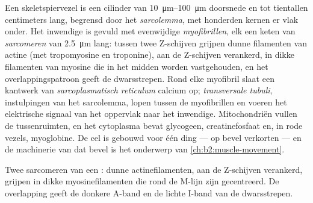 \begin{definition}[De spiervezel]\label{def:b2:cell-differentiation:fibre}
Een skeletspiervezel is een cilinder van \qtyrange{10}{100}{\micro m}
doorsnede en tot tientallen centimeters lang, begrensd door het
\emph{sarcolemma}, met honderden kernen er vlak onder. Het inwendige is
gevuld met evenwijdige \emph{myofibrillen}, elk een keten van
\emph{sarcomeren} van \qty{2.5}{\micro m} lang: tussen twee Z-schijven
grijpen dunne filamenten van actine (met tropomyosine en troponine), aan de
Z-schijven verankerd, in dikke filamenten van myosine die in het midden
worden vastgehouden, en het overlappingspatroon geeft de dwarsstrepen. Rond
elke myofibril slaat een kantwerk van \emph{sarcoplasmatisch reticulum}
calcium op; \emph{transversale tubuli}, instulpingen van het sarcolemma,
lopen tussen de myofibrillen en voeren het elektrische signaal van het
oppervlak naar het inwendige. Mitochondriën vullen de tussenruimten, en het
cytoplasma bevat glycogeen, creatinefosfaat en, in rode vezels,
myoglobine. De cel is gebouwd voor één ding --- op bevel verkorten --- en de
machinerie van dat bevel is het onderwerp van
\cref{ch:b2:muscle-movement}.
\end{definition}

\begin{omfigure}

{\small Twee sarcomeren van een : dunne actinefilamenten, aan de
Z-schijven verankerd, grijpen in dikke myosinefilamenten die rond de M-lijn
zijn gecentreerd. De overlapping geeft de donkere A-band en de lichte I-band
van de dwarsstrepen.}
\end{omfigure}

